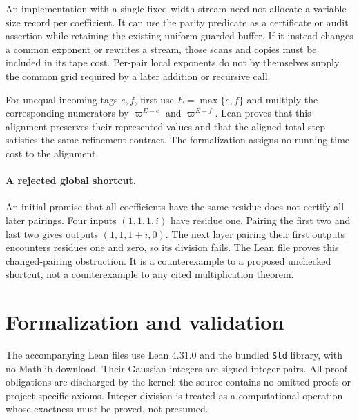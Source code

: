 \documentclass[11pt]{article}
\theoremstyle{definition}\newtheorem{definition}[theorem]{Definition}
\theoremstyle{remark}\newtheorem{remark}[theorem]{Remark}
\newcommand{\p}{\varpi}
\newcommand{\code}[1]{\nolinkurl{#1}}
\begin{document}
An implementation with a single fixed-width stream need not allocate a variable-size record per coefficient. It can use the parity predicate as a certificate or audit assertion while retaining the existing uniform guarded buffer. If it instead changes a common exponent or rewrites a stream, those scans and copies must be included in its tape cost. Per-pair local exponents do not by themselves supply the common grid required by a later addition or recursive call.

For unequal incoming tags $e,f$, first use $E=\max\{e,f\}$ and multiply the corresponding numerators by $\p^{E-e}$ and $\p^{E-f}$. Lean proves that this alignment preserves their represented values and that the aligned total step satisfies the same refinement contract. The formalization assigns no running-time cost to the alignment.

\paragraph{A rejected global shortcut.}
An initial promise that all coefficients have the same residue does not certify all later pairings. Four inputs $(1,1,1,i)$ have residue one. Pairing the first two and last two gives outputs $(1,1,1+i,0)$. The next layer pairing their first outputs encounters residues one and zero, so its division fails. The Lean file proves this changed-pairing obstruction. It is a counterexample to a proposed unchecked shortcut, not a counterexample to any cited multiplication theorem.

\section{Formalization and validation}
The accompanying Lean files use Lean 4.31.0 and the bundled \code{Std} library, with no Mathlib download. Their Gaussian integers are signed integer pairs. All proof obligations are discharged by the kernel; the source contains no omitted proofs or project-specific axioms. Integer division is treated as a computational operation whose exactness must be proved, not presumed.
\end{document}
